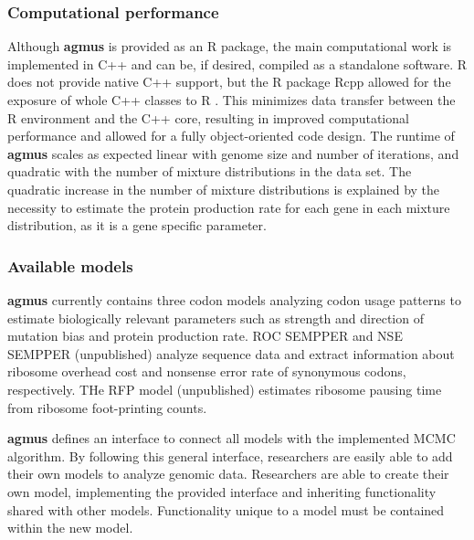 \documentclass{bioinfo}
\newcommand{\package}{\textbf{agmus }} %
\begin{document}
\subsubsection*{Computational performance}
Although \package is provided as an R package, the main computational work is implemented in C++ and can be, if desired, compiled as a standalone software.
R does not provide native C++ support, but the R package Rcpp allowed for the exposure of whole C++ classes to R  \citep{rcpp_package}.
This minimizes data transfer between the R environment and the C++ core, resulting in improved computational performance and allowed for a fully object-oriented code design. 
The runtime of \package scales as expected linear with genome size and number of iterations, and quadratic with the number of mixture distributions in the data set. The quadratic increase in the number of mixture distributions is explained by the necessity to estimate the protein production rate for each gene in each mixture distribution, as it is a gene specific parameter.  

\subsubsection*{Available models}
\package currently contains three codon models analyzing codon usage patterns to estimate biologically relevant parameters such as strength and direction of mutation bias and protein production rate. 
ROC SEMPPER \citep{gilchrist2015} and NSE SEMPPER (unpublished) analyze sequence data and extract information about ribosome overhead cost and nonsense error rate of synonymous codons, respectively. 
THe RFP model (unpublished) estimates ribosome pausing time from ribosome foot-printing counts.


\package defines an interface to connect all models with the implemented MCMC algorithm. 
By following this general interface, researchers are easily able to add their own models to analyze genomic data.
Researchers are able to create their own model, implementing the provided interface and inheriting functionality shared with other models.
Functionality unique to a model must be contained within the new model. 



\end{document}
